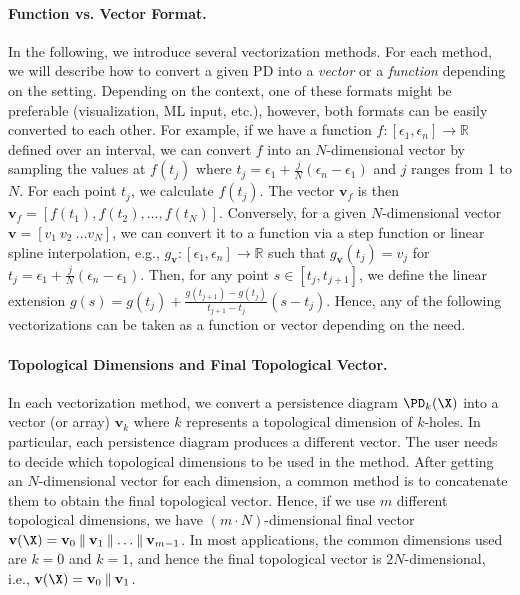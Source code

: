 \paragraph*{Function vs. Vector Format.} In the following, we introduce several vectorization methods. For each method, we will describe how to convert a given PD into a \textit{vector} or a \textit{function} depending on the setting. Depending on the context, one of these formats might be preferable (visualization, ML input, etc.), however, both formats can be easily converted to each other. For example, if we have a function $f:[\epsilon_1,\epsilon_n]\to\mathbb{R}$ defined over an interval, we can convert $f$ into an $N$-dimensional vector by sampling the values at $f(t_j)$ where $t_j = \epsilon_1 + \frac{j}{N}(\epsilon_n - \epsilon_1)$ and $j$ ranges from 1 to $N$. For each point $t_j$, we calculate $f(t_j)$. The vector $\mathbf{v}_f$ is then  $\mathbf{v}_f=[f(t_1), f(t_2), \dots, f(t_N)]$. Conversely, for a given $N$-dimensional vector $\mathbf{v}=[v_1 \ v_2 \ \dots v_N]$, we can convert it to a function via a step function or linear spline interpolation, e.g., $g_\mathbf{v}:[\epsilon_1,\epsilon_n]\to\mathbb{R}$ such that $g_\mathbf{v}(t_j)=v_j$ for $t_j=\epsilon_1+\frac{j}{N}(\epsilon_n-\epsilon_1)$. Then, for any point $s\in[t_j,t_{j+1}]$, we define the linear extension $g(s)=g(t_j)+\frac{g(t_{j+1})-g(t_j)}{t_{j+1}-t_j}(s-t_j)$. Hence, any of the following vectorizations can be taken as a function or vector depending on the need.


\paragraph*{Topological Dimensions and Final Topological Vector.} In each vectorization method, we convert a persistence diagram $\PD_k(\X)$ into a vector (or array) $\mathbf{v}_k$ where $k$ represents a topological dimension of $k$-holes. In particular, each persistence diagram produces a different vector. The user needs to decide which topological dimensions to be used in the method. After getting an $N$-dimensional vector for each dimension, a common method is to concatenate them to obtain the final topological vector. Hence, if we use $m$ different topological dimensions, we have $(m\cdot N)$-dimensional final vector $\mathbf{v}(\X)=\mathbf{v}_0\mathbin\Vert \mathbf{v}_1\mathbin\Vert \dots\mathbin\Vert \mathbf{v}_{m-1}$. In most applications, the common dimensions used are $k=0$ and $k=1$, and hence the final topological vector is $2N$-dimensional, i.e., $\mathbf{v}(\X)=\mathbf{v}_0\mathbin\Vert \mathbf{v}_1$.


